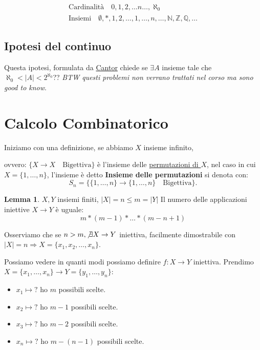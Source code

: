\documentclass{article}
\theoremstyle{definition}
\newtheorem{lemma}{Lemma}[section]
\begin{document}
\begin{align*}
        \mbox{Cardinalità} \quad 0,1,2,\ldots n\ldots,\aleph_0 \\
        \mbox{Insiemi} \quad \emptyset, {*}, {1,2}, \ldots, {1,\ldots,n},\ldots,\mathbb{N},\mathbb{Z},\mathbb{Q},\ldots        
\end{align*}



\subsection{Ipotesi del continuo}
Questa ipotesi, formulata da \underline{Cantor} chiede se $ \exists A$ insieme tale che $\aleph_0 < |A| < 2^{\aleph_0}$?? 
\textit{BTW questi problemi non verrano trattati nel corso ma sono good to know}.






\newpage
\section{Calcolo Combinatorico}

Iniziamo con una definizione, se abbiamo $X$ insieme infinito, \par ovvero: $\{X \to X \quad \mbox{Bigettiva}\}$ è l'insieme delle \underline{permutazioni di $X$}, nel caso in cui $X = \{1,\ldots, n\}$, l'insieme è detto \textbf{Insieme delle permutazioni} si denota con:
\begin{equation*}
        S_n = \{\{1,\ldots, n\} \to \{ 1,\ldots,n\} \quad \mbox{Bigettiva}\}.
\end{equation*}

\begin{lemma}
$X,Y$ insiemi finiti, $|X| = n \le m = |Y|$ Il numero delle applicazioni iniettive $X \to Y$ è uguale:
\begin{equation*}
        m * (m-1)*\ldots*(m-n+1)
\end{equation*}
\end{lemma}

Osserviamo che se $n > m, \not \exists X \to Y$ iniettiva, facilmente dimostrabile con $|X| = n \Rightarrow X = \{x_1,x_2,\ldots,x_n\}$. \par
Possiamo vedere in quanti modi possiamo definire $f:X \to Y$ iniettiva. 
Prendimo $X = \{x_1,\ldots,x_n\} \to Y = \{y_1,\ldots,y_n\}$:
\begin{itemize}
        \item $x_1 \mapsto \mbox{?}$ ho $m$ possibili scelte.
        \item $x_2 \mapsto \mbox{?}$ ho $m-1$ possibili scelte.
        \item $x_3 \mapsto \mbox{?}$ ho $m-2$ possibili scelte.
        \item $x_n \mapsto \mbox{?}$ ho $m-(n-1)$ possibili scelte.
\end{itemize}
\end{document}
